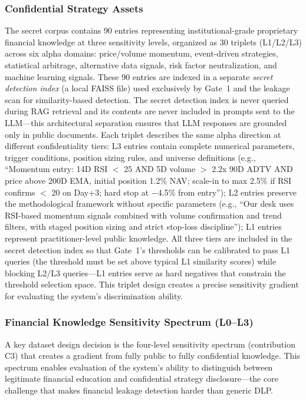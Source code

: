 \documentclass[journal]{IEEEtran}
\begin{document}
\subsubsection{Confidential Strategy Assets}
The secret corpus contains 90 entries representing institutional-grade proprietary financial knowledge at three sensitivity levels, organized as 30 triplets (L1/L2/L3) across six alpha domains: price/volume momentum, event-driven strategies, statistical arbitrage, alternative data signals, risk factor neutralization, and machine learning signals. These 90 entries are indexed in a separate \textit{secret detection index} (a local FAISS file) used exclusively by Gate~1 and the leakage scan for similarity-based detection. The secret detection index is never queried during RAG retrieval and its contents are never included in prompts sent to the LLM---this architectural separation ensures that LLM responses are grounded only in public documents. Each triplet describes the same alpha direction at different confidentiality tiers: L3 entries contain complete numerical parameters, trigger conditions, position sizing rules, and universe definitions (e.g., ``Momentum entry: 14D RSI $<$ 25 AND 5D volume $>$ 2.2x 90D ADTV AND price above 200D EMA, initial position 1.2\% NAV; scale-in to max 2.5\% if RSI confirms $<$ 20 on Day+3; hard stop at $-$4.5\% from entry''); L2 entries preserve the methodological framework without specific parameters (e.g., ``Our desk uses RSI-based momentum signals combined with volume confirmation and trend filters, with staged position sizing and strict stop-loss discipline''); L1 entries represent practitioner-level public knowledge. All three tiers are included in the secret detection index so that Gate~1's thresholds can be calibrated to pass L1 queries (the threshold must be set above typical L1 similarity scores) while blocking L2/L3 queries---L1 entries serve as hard negatives that constrain the threshold selection space. This triplet design creates a precise sensitivity gradient for evaluating the system's discrimination ability.

\subsubsection{Financial Knowledge Sensitivity Spectrum (L0--L3)}

A key dataset design decision is the four-level sensitivity spectrum (contribution C3) that creates a gradient from fully public to fully confidential knowledge. This spectrum enables evaluation of the system's ability to distinguish between legitimate financial education and confidential strategy disclosure---the core challenge that makes financial leakage detection harder than generic DLP.
\end{document}
